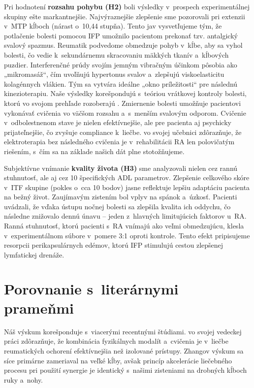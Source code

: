 Pri hodnotení \textbf{rozsahu pohybu (H2)} boli výsledky v~prospech experimentálnej skupiny ešte markantnejšie. Najvýraznejšie zlepšenie sme pozorovali pri extenzii v~MTP kĺboch (nárast o~10,44 stupňa). Tento jav vysvetľujeme tým, že potlačenie bolesti pomocou IFP umožnilo pacientom prekonať tzv. antalgický svalový spazmus. Reumatik podvedome obmedzuje pohyb v~kĺbe, aby sa vyhol bolesti, čo vedie k~sekundárnemu skracovaniu mäkkých tkanív a~kĺbových puzdier. Interferenčné prúdy svojím jemným vibračným účinkom pôsobia ako „mikromasáž“, čím uvoľňujú hypertonus svalov a~zlepšujú viskoelasticitu kolagénnych vlákien. Tým sa vytvára ideálne „okno príležitosti“ pre následnú kinezioterapiu. Naše výsledky korešpondujú s~teóriou vrátkovej kontroly bolesti, ktorú vo svojom prehľade rozoberajú \textcite{Rampazo2022}. Zmiernenie bolesti umožňuje pacientovi vykonávať cvičenia vo väčšom rozsahu a~s~menším svalovým odporom. Cvičenie v~odbolestnenom stave je nielen efektívnejšie, ale pre pacienta aj psychicky prijateľnejšie, čo zvyšuje compliance k~liečbe. \textcite{kolar2009rehabilitace} vo svojej učebnici zdôrazňuje, že elektroterapia bez následného cvičenia je v~rehabilitácii RA len polovičatým riešením, s~čím sa na základe našich dát plne stotožňujeme.

Subjektívne vnímanie \textbf{kvality života (H3)} sme analyzovali nielen cez rannú stuhnutosť, ale aj cez 10 špecifických ADL parametrov. Zlepšenie celkového skóre v~ITF skupine (pokles o~cca 10 bodov) jasne reflektuje lepšiu adaptáciu pacienta na bežný život. Zaujímavým zistením bol vplyv na spánok a~úzkosť. Pacienti uvádzali, že vďaka ústupu nočnej bolesti sa zlepšila kvalita ich oddychu, čo následne znižovalo dennú únavu – jeden z~hlavných limitujúcich faktorov u~RA. Ranná stuhnutosť, ktorú pacienti s~RA vnímajú ako veľmi obmedzujúcu, klesla v~experimentálnom súbore v~pomere 3:1 oproti kontrole. Tento efekt pripisujeme resorpcii perikapsulárnych edémov, ktorú IFP stimulujú cestou zlepšenej lymfatickej drenáže.

\section{Porovnanie s~literárnymi prameňmi}

Náš výskum korešponduje s~viacerými recentnými štúdiami. \textcite{Zhang2025} vo svojej vedeckej práci zdôrazňuje, že kombinácia fyzikálnych modalít a~cvičenia je v~liečbe reumatických ochorení efektívnejšia než izolované prístupy. Zhangov výskum sa síce primárne zameriaval na veľké kĺby, avšak princíp akcelerácie liečebného procesu pri použití synergie je identický s~našimi zisteniami na drobných kĺboch ruky a~nohy.

